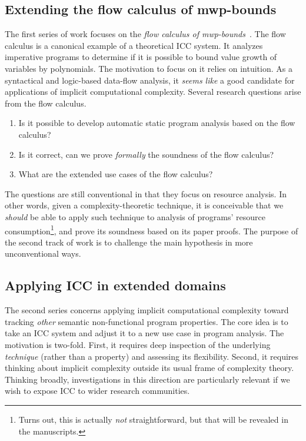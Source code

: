 \subsection{Extending the flow calculus of mwp-bounds}
The first series of work focuses on the \emph{flow calculus of mwp-bounds}~\cite{jones2009}.
The flow calculus is a canonical example of a theoretical ICC system.
It analyzes imperative programs to determine if it is possible to bound value growth of variables by polynomials.
The motivation to focus on it relies on intuition.
As a syntactical and logic-based data-flow analysis, it \emph{seems like} a good candidate for applications of implicit computational complexity.
Several research questions arise from the flow calculus.
\begin{enumerate}
\item Is it possible to develop automatic static program analysis based on the flow calculus?
\item Is it correct, \ie can we prove \emph{formally} the soundness of the flow calculus?
\item What are the extended use cases of the flow calculus?
\end{enumerate}
The questions are still conventional in that they focus on resource analysis.
In other words, given a complexity-theoretic technique, it is conceivable that we \emph{should} be able to apply such technique to analysis of programs' resource consumption\footnote{
Turns out, this is actually \emph{not} straightforward, but that will be revealed in the manuscripts.},
and prove its soundness based on its paper proofs.
The purpose of the second track of work is to challenge the main hypothesis in more unconventional ways.

\subsection{Applying ICC in extended domains}
The second series concerns applying implicit computational complexity toward tracking \emph{other} semantic non-functional program properties.
The core idea is to take an ICC system and adjust it to a new use case in program analysis.
The motivation is two-fold.
First, it requires deep inspection of the underlying \emph{technique} (rather than a property) and assessing its flexibility.
Second, it requires thinking about implicit complexity outside its usual frame of complexity theory.
Thinking broadly, investigations in this direction are particularly relevant if we wish to expose ICC to wider research communities.

